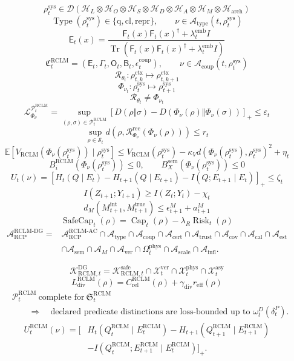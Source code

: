 \documentclass[11pt,a4paper]{article}
\newcommand{\D}{\mathcal D}
\newcommand{\Hcal}{\mathcal H}
\newcommand{\Lcal}{\mathcal L}
\newcommand{\Pcal}{\mathcal P}
\newcommand{\Acal}{\mathcal A}
\newcommand{\Kcal}{\mathcal K}
\newcommand{\Rcal}{\mathcal R}
\newcommand{\Xcal}{\mathcal X}
\newcommand{\Scal}{\mathcal S}
\newcommand{\calib}{\mathrm{cal}}
\newcommand{\Tr}{\operatorname{Tr}}
\newcommand{\eps}{\varepsilon}
\newcommand{\RCP}{\mathrm{RCP}}
\newcommand{\RCLM}{\mathrm{RCLM}}
\newcommand{\AC}{\mathrm{AC}}
\newcommand{\DG}{\mathrm{DG}}
\newcommand{\sem}{\mathrm{sem}}
\newcommand{\sys}{\mathrm{sys}}
\newcommand{\ctx}{\mathrm{ctx}}
\newcommand{\arch}{\mathrm{arch}}
\newcommand{\rec}{\mathrm{rec}}
\newcommand{\safe}{\mathrm{safe}}
\newcommand{\true}{\mathrm{true}}
\newcommand{\rel}{\mathrm{rel}}
\providecommand{\Cap}{\operatorname{Cap}}
\newcommand{\SafeCap}{\operatorname{SafeCap}}
\newcommand{\Risk}{\operatorname{Risk}}
\newcommand{\ver}{\mathrm{ver}}
\newcommand{\phys}{\mathrm{phys}}
\newcommand{\asy}{\mathrm{asy}}
\newcommand{\cert}{\mathrm{cert}}
\newcommand{\qtype}{\mathrm{q}}
\newcommand{\cltype}{\mathrm{cl}}
\newcommand{\reptype}{\mathrm{repr}}
\newcommand{\emb}{\mathrm{emb}}
\newcommand{\coup}{\mathrm{coup}}
\newcommand{\trust}{\mathrm{trust}}
\newcommand{\scale}{\mathrm{scale}}
\newcommand{\infl}{\mathrm{infl}}
\newcommand{\cov}{\mathrm{cov}}
\newcommand{\est}{\mathrm{est}}
\begin{document}
\[
\rho_t^{\sys}\in\D(\Hcal_L\otimes\Hcal_O\otimes\Hcal_S\otimes\Hcal_D\otimes\Hcal_A\otimes\Hcal_M\otimes\Hcal_{\arch})
\]
\[
\operatorname{Type}(\rho_t^{\sys})\in\{\qtype,\cltype,\reptype\},
\qquad
\nu\in\Acal_{\mathrm{type}}(t,\rho_t^{\sys})
\]
\[
\mathsf E_t(x)=\frac{\mathsf F_t(x)\mathsf F_t(x)^\dagger+\lambda_t^{\emb}I}
{\Tr(\mathsf F_t(x)\mathsf F_t(x)^\dagger+\lambda_t^{\emb}I)}
\]
\[
\mathfrak C_t^{\RCLM}=(\mathsf E_t,\Gamma_t,\mathsf O_t,\mathsf B_t,\epsilon_t^{\coup}),
\qquad
\nu\in\Acal_{\coup}(t,\rho_t^{\sys})
\]
\[
\Rcal_{\theta_t}:\rho_{t,k}^{\ctx}\mapsto\rho_{t,k+1}^{\ctx}
\]
\[
\Phi_{\nu_t}:\rho_t^{\sys}\mapsto\rho_{t+1}^{\sys}
\]
\[
\Rcal_{\theta_t}\neq\Phi_{\nu_t}
\]
\[
\Lcal^{\Pcal_t^{\RCLM}}_{\Phi_\nu}
=
\sup_{(\rho,\sigma)\in\Pcal_t^{\RCLM}}
[D(\rho\Vert\sigma)-D(\Phi_\nu(\rho)\Vert\Phi_\nu(\sigma))]_+
\le\eps_t
\]
\[
\sup_{\rho\in\Scal_t}
d(\rho,\mathcal R_{\Phi_\nu}^{\rec}(\Phi_\nu(\rho)))\le r_t
\]
\[
\mathbb E[V_{\RCLM}(\Phi_\nu(\rho_t^{\sys}))\mid\rho_t^{\sys}]
\le
V_{\RCLM}(\rho_t^{\sys})-\kappa_Vd(\Phi_\nu(\rho_t^{\sys}),\rho_t^{\sys})^2+\eta_t
\]
\[
B_i^{\RCLM}(\Phi_\nu(\rho_t^{\sys}))\le0,
\qquad
B_X^{\sem}(\Phi_\nu(\rho_t^{\sys}))\le0
\]
\[
U_t(\nu)=
[H_t(Q\mid E_t)-H_{t+1}(Q\mid E_{t+1})-I(Q;E_{t+1}\mid E_t)]_+
\le\zeta_t
\]
\[
I(Z_{t+1};Y_{t+1})\ge I(Z_t;Y_t)-\chi_t
\]
\[
d_M(M_{t+1}^{\mathrm{int}},M_{t+1}^{\true})\le\epsilon_{t+1}^M+a_{t+1}^M
\]
\[
\SafeCap_t(\rho)=\Cap_t(\rho)-\lambda_R\Risk_t(\rho)
\]
\[
\begin{aligned}
\Acal_{\RCP}^{\RCLM\text{-}\DG}
={}&
\Acal_{\RCP}^{\RCLM\text{-}\AC}
\cap\Acal_{\mathrm{type}}
\cap\Acal_{\coup}
\cap\Acal_{\cert}
\cap\Acal_{\trust}
\cap\Acal_{\cov}
\cap\Acal_{\calib}
\cap\Acal_{\est}\\
&\cap\Acal_{\sem}
\cap\Acal_M
\cap\Acal_{\ver}
\cap\Omega_t^{\phys}
\cap\Acal_{\scale}
\cap\Acal_{\infl}.
\end{aligned}
\]

\[
\Kcal_{\RCLM,t}^{\DG}
=
\Kcal_{\RCLM,t}^{\safe}
\cap \Xcal_t^{\ver}\cap \Xcal_t^{\phys}\cap \Xcal_t^{\asy}
\]
\[
L_{\mathrm{div}}^{\RCLM}(\rho)=C_{\rel}^{\RCLM}(\rho)+\gamma_{\mathrm{div}}r_{\mathrm{eff}}(\rho)
\]
\[
\begin{aligned}
&\Pcal_t^{\RCLM}\ \text{complete for}\ \mathfrak S_t^{\RCLM}\\
&\qquad\Longrightarrow\quad
\text{declared predicate distinctions are loss-bounded up to }\omega_t^D(\delta_t^P).
\end{aligned}
\]
\[
\begin{aligned}
U_t^{\RCLM}(\nu)=
\Big[&H_t(Q_t^{\RCLM}\mid E_t^{\RCLM})
-H_{t+1}(Q_{t+1}^{\RCLM}\mid E_{t+1}^{\RCLM})\\
&-I(Q_t^{\RCLM};E_{t+1}^{\RCLM}\mid E_t^{\RCLM})\Big]_+.
\end{aligned}
\]
\end{document}
